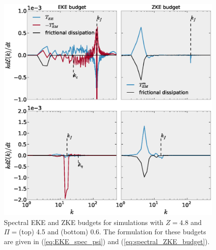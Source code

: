 \documentclass{ametsoc}
\begin{document}
\begin{figure}
\begin{center}
\includegraphics[width=6in]{EKE_ZKE_budget_drag8e-4}\caption{Spectral EKE and ZKE budgets for simulations with $Z=4.8$ and $\Pi=$(top)
4.5 and (bottom) 0.6. The formulation for these budgets are given
in (\ref{eq:EKE_spec_psi}) and (\ref{eq:spectral_ZKE_budget}).}
\label{EKE_ZKE_spectral_budget_drag8e-4}
\end{center}
\end{figure}
\end{document}
